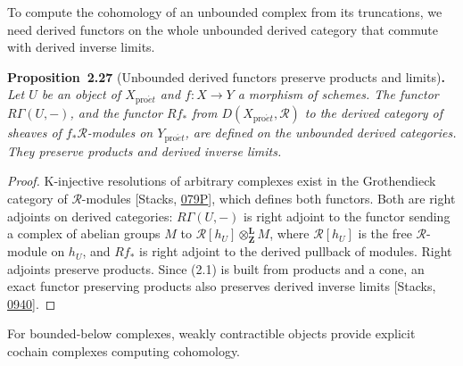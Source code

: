 \documentclass[11pt]{article}
\newenvironment{bpstatement}[2]{\par\addvspace{0.6\baselineskip}\noindent\textbf{#1}#2\textbf{.}\enspace\ignorespaces}
  {\par\addvspace{0.4\baselineskip}}
\newenvironment{bpstatementit}[2]{\begin{bpstatement}{#1}{#2}\itshape\ignorespaces}{\end{bpstatement}}
\begin{document}
\label{bp79}%
To compute the cohomology of an unbounded complex from its truncations, we need derived functors on the whole unbounded derived category that commute with derived inverse limits.

\label{bp80}%
\begin{bpstatementit}{Proposition~2.27}{ (Unbounded derived functors preserve products and limits)}
Let \(U\) be an object of \(X_{\mathrm{pro}\acute{e}t}\) and \(f:X\to Y\) a morphism of schemes. The functor \(R\Gamma(U,-)\), and the functor \(Rf_*\) from \(D(X_{\mathrm{pro}\acute{e}t},\mathcal R)\) to the derived category of sheaves of \(f_*\mathcal R\)-modules on \(Y_{\mathrm{pro}\acute{e}t}\), are defined on the unbounded derived categories. They preserve products and derived inverse limits.
\end{bpstatementit}

\begin{proof}[{Proof}]\label{bp81}%
K-injective resolutions of arbitrary complexes exist in the Grothendieck category of \(\mathcal R\)-modules [Stacks, \href{https://stacks.math.columbia.edu/tag/079P}{079P}], which defines both functors. Both are right adjoints on derived categories: \(R\Gamma(U,-)\) is right adjoint to the functor sending a complex of abelian groups \(M\) to \(\mathcal R[h_U]\otimes^{\mathbf L}_{\mathbf Z}M\), where \(\mathcal R[h_U]\) is the free \(\mathcal R\)-module on \(h_U\), and \(Rf_*\) is right adjoint to the derived pullback of modules. Right adjoints preserve products. Since (2.1) is built from products and a cone, an exact functor preserving products also preserves derived inverse limits [Stacks, \href{https://stacks.math.columbia.edu/tag/0940}{0940}].
\end{proof}

\label{bp82}%
For bounded-below complexes, weakly contractible objects provide explicit cochain complexes computing cohomology.
\end{document}
